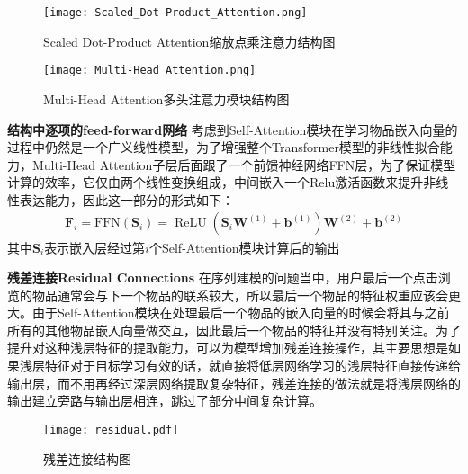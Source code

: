 \begin{figure}[!htb]
   \begin{minipage}{0.48\textwidth}
     \centering
     \texttt{[image: Scaled\_Dot-Product\_Attention.png]} %
     \caption{Scaled Dot-Product Attention缩放点乘注意力结构图}
     \label{Fig:Scaled_Dot-Product_Attention}
   \end{minipage}\hfill
   \begin {minipage}{0.48\textwidth}
     \centering
     \texttt{[image: Multi-Head\_Attention.png]} %
     \caption{Multi-Head Attention多头注意力模块结构图}
     \label{Fig:Multi-Head_Attention}
   \end{minipage}
\end{figure}

\textbf{结构中逐项的feed-forward网络}
考虑到Self-Attention模块在学习物品嵌入向量的过程中仍然是一个广义线性模型，为了增强整个Transformer模型的非线性拟合能力，Multi-Head Attention子层后面跟了一个前馈神经网络FFN层，为了保证模型计算的效率，它仅由两个线性变换组成，中间嵌入一个Relu激活函数来提升非线性表达能力，因此这一部分的形式如下：
\begin{align}
	\mathbf{F}_{i}=\mathrm{FFN}\left(\mathbf{S}_{i}\right)=\operatorname{ReLU}\left(\mathbf{S}_{i} \mathbf{W}^{(1)}+\mathbf{b}^{(1)}\right) \mathbf{W}^{(2)}+\mathbf{b}^{(2)}
\end{align}
其中$\mathbf{S}_{i}$表示嵌入层经过第$i$个Self-Attention模块计算后的输出

\textbf{残差连接Residual Connections}
在序列建模的问题当中，用户最后一个点击浏览的物品通常会与下一个物品的联系较大，所以最后一个物品的特征权重应该会更大。由于Self-Attention模块在处理最后一个物品的嵌入向量的时候会将其与之前所有的其他物品嵌入向量做交互，因此最后一个物品的特征并没有特别关注。为了提升对这种浅层特征的提取能力，可以为模型增加残差连接操作，其主要思想是如果浅层特征对于目标学习有效的话，就直接将低层网络学习的浅层特征直接传递给输出层，而不用再经过深层网络提取复杂特征，残差连接的做法就是将浅层网络的输出建立旁路与输出层相连，跳过了部分中间复杂计算。

\begin{figure}
\centering
\texttt{[image: residual.pdf]}
\caption{残差连接结构图}
\label{residual}
\end{figure}

